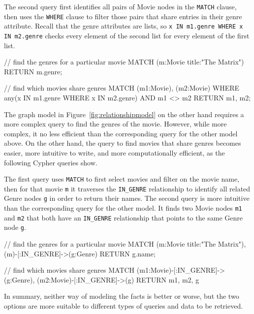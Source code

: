 The second query first identifies all pairs of Movie nodes in the \texttt{MATCH} clause, then uses the \texttt{WHERE} clause to filter those pairs that share entries in their genre attribute. Recall that the genre attributes are lists, so \texttt{x IN m1.genre WHERE x IN m2.genre} checks every element of the second list for every element of the first list. 

\begin{cyphercode}
// find the genres for a particular movie
MATCH (m:Movie {title:"The Matrix"})
RETURN m.genre;

// find which movies share genres
MATCH (m1:Movie), (m2:Movie)
WHERE any(x IN m1.genre 
          WHERE x IN m2.genre)
AND m1 <> m2
RETURN m1, m2;
\end{cyphercode}

The graph model in Figure~\ref{fig:relationshipmodel} on the other hand requires a more complex query to find the genres of the movie. However, while more complex, it no less efficient than the corresponding query for the other model above. On the other hand, the query to find movies that share genres becomes easier, more intuitive to write, and more computationally efficient, as the following Cypher queries show.

The first query uses \texttt{MATCH} to first select movies and filter on the movie name, then for that movie \texttt{m} it traverses the \texttt{IN\_GENRE} relationship to identify all related Genre nodes \texttt{g} in order to return their names. The second query is more intuitive than the corresponding query for the other model. It finds two Movie nodes \texttt{m1} and \texttt{m2} that both have an \texttt{IN\_GENRE} relationship that points to the same Genre node \texttt{g}. 

\begin{cyphercode}
// find the genres for a particular movie
MATCH (m:Movie {title:"The Matrix"}),
      (m)-[:IN_GENRE]->(g:Genre)
RETURN g.name;

// find which movies share genres
MATCH (m1:Movie)-[:IN_GENRE]->(g:Genre),
      (m2:Movie)-[:IN_GENRE]->(g)
RETURN m1, m2, g
\end{cyphercode}

In summary, neither way of modeling the facts is better or worse, but the two options are more suitable to different types of queries and data to be retrieved.

